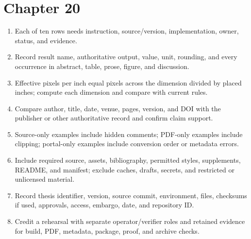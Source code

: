 \section*{Chapter 20}
\begin{enumerate}[label=20.\arabic*,leftmargin=2.4em,itemsep=0.45em]
  \item Each of ten rows needs instruction, source/version, implementation,
        owner, status, and evidence.
  \item Record result name, authoritative output, value, unit, rounding, and
        every occurrence in abstract, table, prose, figure, and discussion.
  \item Effective pixels per inch equal pixels across the dimension divided by
        placed inches; compute each dimension and compare with current rules.
  \item Compare author, title, date, venue, pages, version, and DOI with the
        publisher or other authoritative record and confirm claim support.
  \item Source-only examples include hidden comments; PDF-only examples include
        clipping; portal-only examples include conversion order or metadata errors.
  \item Include required source, assets, bibliography, permitted styles,
        supplements, README, and manifest; exclude caches, drafts, secrets, and
        restricted or unlicensed material.
  \item Record thesis identifier, version, source commit, environment, files,
        checksums if used, approvals, access, embargo, date, and repository ID.
  \item Credit a rehearsal with separate operator/verifier roles and retained
        evidence for build, PDF, metadata, package, proof, and archive checks.
\end{enumerate}

